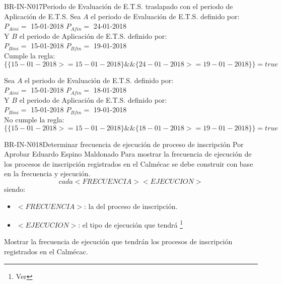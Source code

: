 \begin{BusinessRule}{BR-IN-N017}{Periodo de Evaluación de E.T.S. traslapado con el periodo de Aplicación de E.T.S.}
	Sea $A$ el periodo de Evaluación de E.T.S. definido por: \\
	$P_{Aini}=$ 15-01-2018
	$P_{Afin}=$ 24-01-2018 \\
	Y $B$ el periodo de Aplicación de E.T.S. definido por:\\
	$P_{Bini}=$ 15-01-2018
	$P_{Bfin}=$ 19-01-2018 \\
	
	Cumple la regla:
	$ \{
	\{15-01-2018 >= 15-01-2018\} \&\&
	\{24-01-2018 >= 19-01-2018\}
	\} = true$
	
	Sea $A$ el periodo de Evaluación de E.T.S. definido por: \\
	$P_{Aini}=$ 15-01-2018
	$P_{Afin}=$ 18-01-2018 \\
	Y $B$ el periodo de Aplicación de E.T.S. definido por:\\
	$P_{Bini}=$ 15-01-2018
	$P_{Bfin}=$ 19-01-2018 \\
	
	No cumple la regla:
	$ \{
	\{15-01-2018 >= 15-01-2018\} \&\&
	\{18-01-2018 >= 19-01-2018\}
	\} = true$
\end{BusinessRule}

\begin{BusinessRule}{BR-IN-N018}{Determinar frecuencia de ejecución de proceso de inscripción}
	{\bcIntegridad}    %
	{\btTimer}     %
	{\blControlling}    %
	\BRItem[Estado] Por Aprobar
	 Eduardo Espino Maldonado
	\BRItem[Descripción] Para mostrar la frecuencia de ejecución de los procesos de inscripción registrados en el Calmécac se debe construir con base en la frecuencia y ejecución.
	\BRItem[Sentencia] $$cada <FRECUENCIA> <EJECUCION>$$
		siendo:
		\begin{itemize}
			\item $<FRECUENCIA>$: la  del proceso de inscripción.\cdtEmpty
			\item $<EJECUCION>$: el tipo de ejecución que tendrá \footnote{Ver }
		\end{itemize}
	\BRItem[Motivación] Mostrar la frecuencia de ejecución que tendrán los procesos de inscripción registrados en el Calmécac.
\end{BusinessRule}


